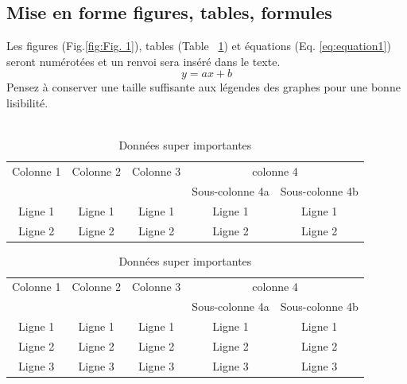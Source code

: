 \documentclass{article}
\begin{document}
\subsection{Mise en forme figures, tables, formules}
Les figures (Fig.\ref{fig:Fig. 1}), tables (Table ~\ref{tab:Table 1}) et équations (Eq. \ref{eq:equation1}) seront numérotées et un renvoi sera inséré dans le texte.
\begin{equation}
y =  ax+b
\label{eq:equation1}
\end{equation}
Pensez à conserver une taille suffisante aux légendes des graphes pour une bonne lisibilité.\\
\\
\begin{table}[htb]\centering
\begin{tabular}{ccccc}
\toprule
     Colonne 1&Colonne 2&Colonne 3&\multicolumn{2}{c}{colonne 4}\\\cmidrule{4-5}
      &	 &	&	Sous-colonne 4a	&Sous-colonne 4b\\ \midrule
      Ligne 1	&Ligne 1&	Ligne 1&	Ligne 1&	Ligne 1\\
      Ligne 2	&Ligne 2&	Ligne 2	&Ligne 2&	Ligne 2\\
      \bottomrule
\end{tabular}
\caption{Données super importantes}
\label{tab:Table 1}
\end{table}

\begin{table}[!h]\centering
\begin{tabular}{ccccc}
\toprule
     Colonne 1&Colonne 2&Colonne 3&\multicolumn{2}{c}{colonne 4}\\\cmidrule{4-5}
      &	 &	&	Sous-colonne 4a	&Sous-colonne 4b\\ \midrule
      Ligne 1	&Ligne 1&	Ligne 1&	Ligne 1&	Ligne 1\\
      Ligne 2	&Ligne 2&	Ligne 2	&Ligne 2&	Ligne 2\\
      Ligne 3	&Ligne 3&	Ligne 3	&Ligne 3&	Ligne 3\\
      \bottomrule
\end{tabular}
\label{Table 2}
\caption{Données super importantes}
\end{table}
\end{document}
